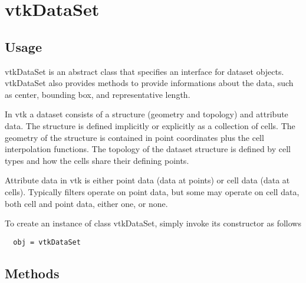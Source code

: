 \section{vtkDataSet}

\subsection{Usage}

 vtkDataSet is an abstract class that specifies an interface for dataset
 objects. vtkDataSet also provides methods to provide informations about
 the data, such as center, bounding box, and representative length.

 In vtk a dataset consists of a structure (geometry and topology) and 
 attribute data. The structure is defined implicitly or explicitly as
 a collection of cells. The geometry of the structure is contained in
 point coordinates plus the cell interpolation functions. The topology
 of the dataset structure is defined by cell types and how the cells
 share their defining points. 

 Attribute data in vtk is either point data (data at points) or cell data
 (data at cells). Typically filters operate on point data, but some may
 operate on cell data, both cell and point data, either one, or none.

To create an instance of class vtkDataSet, simply
invoke its constructor as follows
\begin{verbatim}
  obj = vtkDataSet
\end{verbatim}
\subsection{Methods}

